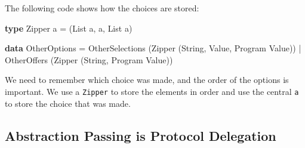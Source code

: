 \documentclass[runningheads,plain]{llncs}
\providecommand{\tightlist}{%
  \setlength{\itemsep}{0pt}\setlength{\parskip}{0pt}}
\newenvironment{Shaded}{}{}
\newcommand{\KeywordTok}[1]{\textcolor[rgb]{0.00,0.44,0.13}{\textbf{#1}}}
\newcommand{\DataTypeTok}[1]{\textcolor[rgb]{0.56,0.13,0.00}{#1}}
\newcommand{\FunctionTok}[1]{\textcolor[rgb]{0.02,0.16,0.49}{#1}}
\newcommand{\NormalTok}[1]{#1}
\begin{document}
\begin{enumerate}
  The following code shows how the choices are stored:

\begin{Shaded}
\begin{Highlighting}[]
\KeywordTok{type} \DataTypeTok{Zipper}\NormalTok{ a }\FunctionTok{=}\NormalTok{ (}\DataTypeTok{List}\NormalTok{ a, a, }\DataTypeTok{List}\NormalTok{ a)}

\KeywordTok{data} \DataTypeTok{OtherOptions}
    \FunctionTok{=} \DataTypeTok{OtherSelections}\NormalTok{ (}\DataTypeTok{Zipper}\NormalTok{ (}\DataTypeTok{String}\NormalTok{, }\DataTypeTok{Value}\NormalTok{, }\DataTypeTok{Program} \DataTypeTok{Value}\NormalTok{))}
    \FunctionTok{|} \DataTypeTok{OtherOffers}\NormalTok{ (}\DataTypeTok{Zipper}\NormalTok{ (}\DataTypeTok{String}\NormalTok{, }\DataTypeTok{Program} \DataTypeTok{Value}\NormalTok{))}
\end{Highlighting}
\end{Shaded}

  We need to remember
  which choice was made, and the order of the options is important. We
  use a \texttt{Zipper} to store the elements in order and use the
  central \texttt{a} to store the choice that was made.
\end{enumerate}



\subsection{Abstraction Passing is Protocol
Delegation}\label{abstraction-passing}
\end{document}
